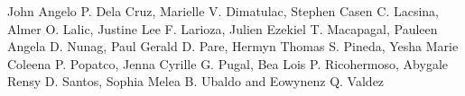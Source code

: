 John Angelo P. Dela Cruz,
Marielle V. Dimatulac,
Stephen Casen C. Lacsina,
Almer O. Lalic,
Justine Lee F. Larioza,
Julien Ezekiel T. Macapagal,
Pauleen Angela D. Nunag,
Paul Gerald D. Pare,
Hermyn Thomas S. Pineda,
Yesha Marie Coleena P. Popatco,
Jenna Cyrille G. Pugal,
Bea Lois P. Ricohermoso,
Abygale Rensy D. Santos,
Sophia Melea B. Ubaldo and
Eowynenz Q. Valdez
